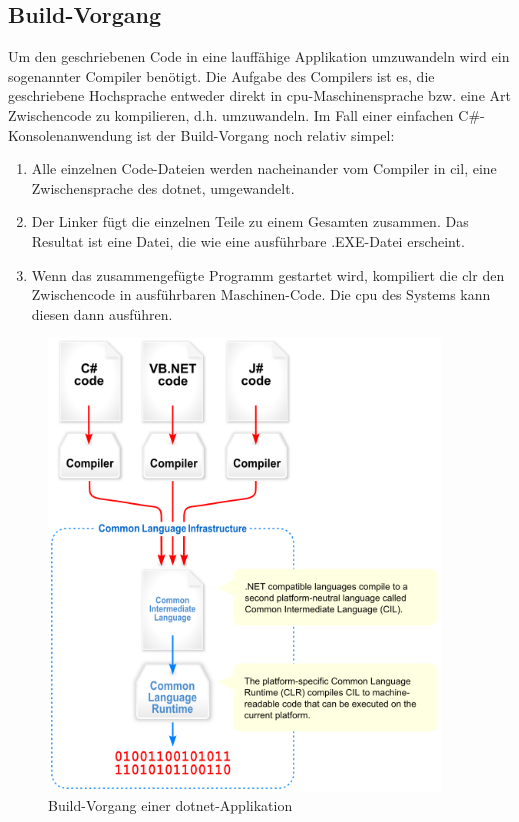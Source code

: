 \subsection{Build-Vorgang}
Um den geschriebenen Code in eine lauffähige Applikation umzuwandeln wird ein sogenannter Compiler benötigt.
Die Aufgabe des Compilers ist es, die geschriebene Hochsprache entweder direkt in \acs{cpu}-Maschinensprache bzw. eine Art Zwischencode zu kompilieren, d.h. umzuwandeln. Im Fall einer einfachen C\#-Konsolenanwendung ist der Build-Vorgang noch relativ simpel:
\begin{enumerate}
    \item Alle einzelnen Code-Dateien werden nacheinander vom Compiler in \ac{cil}, eine Zwischensprache des \ac{dotnet}, umgewandelt.
    \item Der Linker fügt die einzelnen Teile zu einem Gesamten zusammen.
    Das Resultat ist eine Datei, die wie eine ausführbare .EXE-Datei erscheint.
    \item Wenn das zusammengefügte Programm gestartet wird, kompiliert die \ac{clr} den Zwischencode in ausführbaren Maschinen-Code.
    Die \acs{cpu} des Systems kann diesen dann ausführen.
\end{enumerate}
\begin{figure}[H]
    \centering\includegraphics[height=12cm]{images/auswahl_rahmenwerk/dotnet-compilation.png}
    \caption{Build-Vorgang einer \ac{dotnet}-Applikation\cite{wiki-cli}}
\end{figure}

